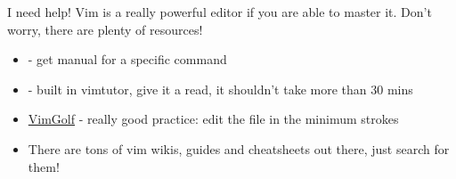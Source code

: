 \documentclass[12pt]{beamer}
\begin{document}
\begin{frame}{I need help!}
    Vim is a really powerful editor if you are able to master it. Don't worry, there are plenty of resources!
    \begin{itemize}
        \item {} - get manual for a specific command
        \item {} - built in vimtutor, give it a read, it shouldn't take more than 30 mins
        \item \href{https://www.vimgolf.com}{VimGolf} - really good practice: edit the file in the minimum strokes
        \item There are tons of vim wikis, guides and cheatsheets out there, just search for them!
    \end{itemize}{}
\end{frame}{}
\end{document}
